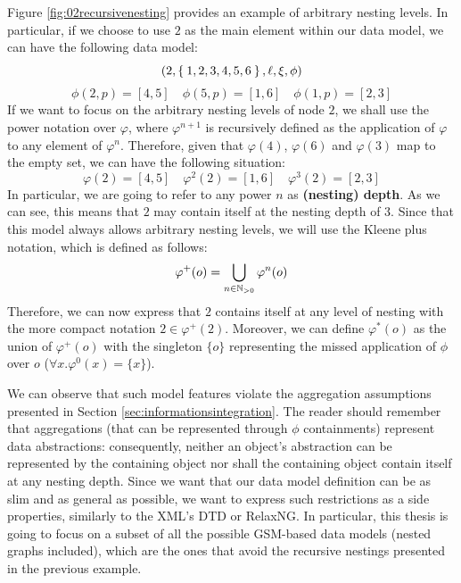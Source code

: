 \begin{example}[continues=ex:nineteedGSMsnd]
	Figure \vref{fig:02recursivenesting} provides an example of arbitrary nesting levels. In particular, if we choose to use $2$ as the main element within our data model, we can have the following data model:
	\[(2,\Set{1,2,3,4,5,6},\ell,\xi,\phi)\]
	\[\phi(2,p)=[4,5]\quad \phi(5,p)=[1,6]\quad \phi(1,p)=[2,3]\]
	If we want to focus on the arbitrary nesting levels of node $2$, we shall use the power notation over $\varphi$, where $\varphi^{n+1}$ is recursively defined as the application of $\varphi$ to any element of $\varphi^n$. Therefore, given that $\varphi(4)$, $\varphi(6)$ and $\varphi(3)$ map to the empty set, we can have the following situation:
	\[\varphi(2)=[4,5]\quad \varphi^2(2)=[1,6]\quad \varphi^3(2)=[2,3]\]
	In particular, we are going to refer to any power $n$ as \textbf{(nesting) depth}. 
	As we can see, this means that $2$ may contain itself at the nesting depth of $3$. Since that this model always allows arbitrary nesting levels, we will use the Kleene plus notation, which is defined as follows:
	\[\varphi^+(o)=\bigcup_{n\in\mathbb{N}_{>0}}\varphi^n(o)\]
	Therefore, we can now express that $2$ contains itself at any level of nesting with the more compact notation $2\in\varphi^+(2)$. Moreover, we can define $\varphi^*(o)$ as the union of $\varphi^+(o)$ with the singleton $\{o\}$ representing the missed application of $\phi$ over $o$ ($\forall x.\varphi^0(x)=\{x\}$).
\end{example}


We can observe that such model features violate the aggregation assumptions presented in Section \vref{sec:informationsintegration}. The reader should remember that aggregations (that can be represented through $\phi$ containments) represent data abstractions:  consequently, neither an object's abstraction can be represented by  the containing object  nor shall the containing object  contain itself at any nesting depth. Since we want that our data model definition can be as slim and as general as possible, we want to express such restrictions as a side properties, similarly to the XML's DTD or RelaxNG. In particular, this thesis is going to focus on a subset of all the possible GSM-based data models (nested graphs included), which are the ones that avoid the recursive nestings presented in the previous example.

